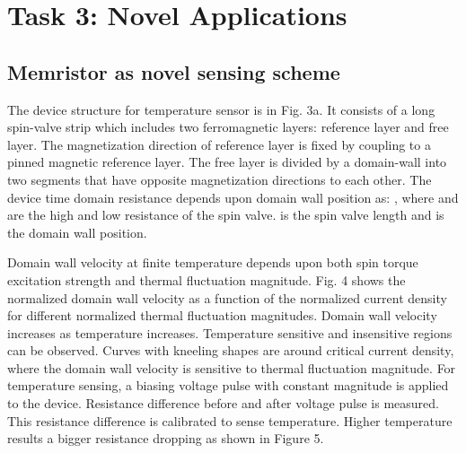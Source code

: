 \section{Task 3: Novel Applications}

\subsection{Memristor as novel sensing scheme}
The device structure for temperature sensor is in Fig. 3a. It consists of a long spin-valve strip which includes two ferromagnetic layers: reference layer and free layer. The magnetization direction of reference layer is fixed by coupling to a pinned magnetic reference layer. The free layer is divided by a domain-wall into two segments that have opposite magnetization directions to each other. The device time domain resistance depends upon domain wall position as:  , where  and  are the high and low resistance of the spin valve.   is the spin valve length and   is the domain wall position.

Domain wall velocity at finite temperature depends upon both spin torque excitation strength and thermal fluctuation magnitude. Fig. 4 shows the normalized domain wall velocity as a function of the normalized current density for different normalized thermal fluctuation magnitudes. Domain wall velocity increases as temperature increases. Temperature sensitive and insensitive regions can be observed. Curves with kneeling shapes are around critical current density, where the domain wall velocity is sensitive to thermal fluctuation magnitude. For temperature sensing, a biasing voltage pulse with constant magnitude is applied to the device.  Resistance difference before and after voltage pulse is measured. This resistance difference is calibrated to sense temperature. Higher temperature results a bigger resistance dropping as shown in Figure 5.

